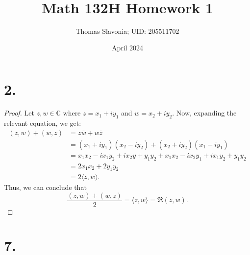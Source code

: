 \documentclass{article}
\title{Math 132H Homework 1}
\author{Thomas Slavonia; UID: 205511702}
\date{April 2024}
\begin{document}
\maketitle

\section*{2.}
\begin{proof}
Let $z, w \in \mathbb{C}$ where $z = x_1 + iy_1$ and $w = x_2 + iy_2$. Now, expanding the relevant equation, we get:
\begin{align*}(z, w) + (w, z) &= z\bar{w} + w\bar{z} \\
    &= (x_1 + iy_1)(x_2 -iy_2) + (x_2 + iy_2)(x_1 - iy_1) \\
    &= x_1x_2 -ix_1y_2 + ix_2y + y_1y_2 + x_1x_2 -ix_2y_1 + ix_1y_2 + y_1y_2 \\
    &= 2x_1x_2 + 2y_1y_2 \\
    &= 2 \langle z, w \rangle. \end{align*}
Thus, we can conclude that 
\[
    \frac{(z, w) + (w, z)}{2} = \langle z, w \rangle = \Re(z, w).
    \]

\end{proof}



\section*{7.}
\end{document}
